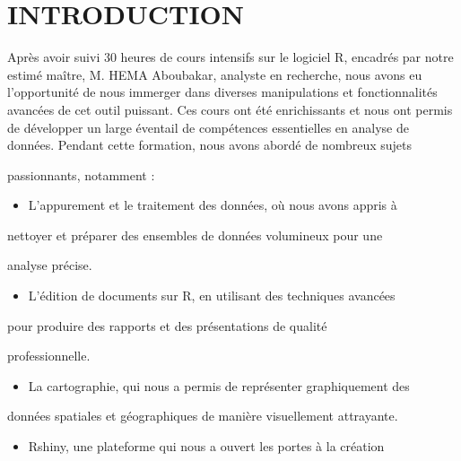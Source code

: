 \documentclass[
  14pt,
]{article}
\author{}
\date{\vspace{-2.5em}}
\providecommand{\tightlist}{%
  \setlength{\itemsep}{0pt}\setlength{\parskip}{0pt}}
\begin{document}


\renewcommand{\contentsname}{\textcolor{blue}{Table des matières}}

\textcolor{blue}{\tableofcontents}

\newpage

\hypertarget{introduction}{%
\section{INTRODUCTION}\label{introduction}}

Après avoir suivi 30 heures de cours intensifs sur le logiciel R,
encadrés par notre estimé maître, M. HEMA Aboubakar, analyste en
recherche, nous avons eu l'opportunité de nous immerger dans diverses
manipulations et fonctionnalités avancées de cet outil puissant. Ces
cours ont été enrichissants et nous ont permis de développer un large
éventail de compétences essentielles en analyse de données. Pendant
cette formation, nous avons abordé de nombreux sujets

passionnants, notamment :

\begin{itemize}
\tightlist
\item
  L'appurement et le traitement des données, où nous avons appris à
\end{itemize}

nettoyer et préparer des ensembles de données volumineux pour une

analyse précise.

\begin{itemize}
\tightlist
\item
  L'édition de documents sur R, en utilisant des techniques avancées
\end{itemize}

pour produire des rapports et des présentations de qualité

professionnelle.

\begin{itemize}
\tightlist
\item
  La cartographie, qui nous a permis de représenter graphiquement des
\end{itemize}

données spatiales et géographiques de manière visuellement attrayante.

\begin{itemize}
\tightlist
\item
  Rshiny, une plateforme qui nous a ouvert les portes à la création
\end{itemize}
\end{document}
